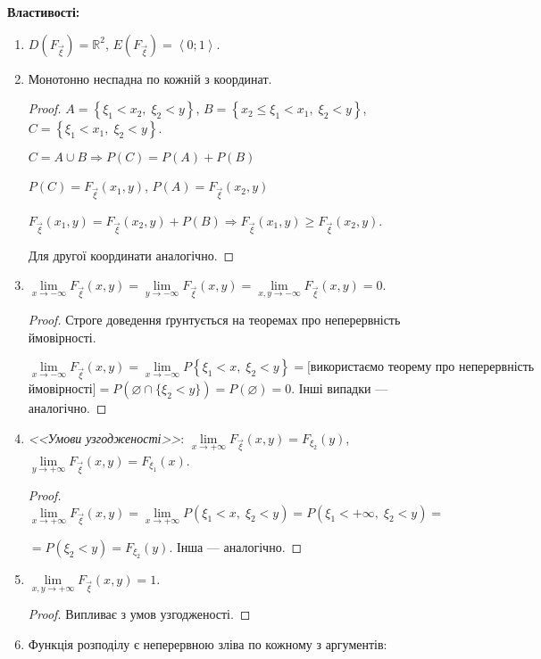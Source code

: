 \noindent\textbf{Властивості: }
\begin{enumerate}
    \item $D(F_{\vec{\xi}}) = \mathbb{R}^2$, $E(F_{\vec{\xi}}) = 
    \left<0; 1\right>$.
    \item Монотонно неспадна по кожній з координат.
    \begin{proof}
        $A = \left\{\xi_1 < x_2,\;\xi_2 < y \right\}$, 
        $B = \left\{x_2 \leq \xi_1 < x_1,\; \xi_2<y\right\}$, 
        $C = \left\{\xi_1 < x_1,\; \xi_2 < y\right\}$.

        $C = A \cup B \Rightarrow P(C) = P(A) + P(B)$
    
        $P(C) = F_{\vec{\xi}}(x_1, y)$,  
        $P(A) = F_{\vec{\xi}}(x_2, y)$

        $F_{\vec{\xi}}(x_1, y) = F_{\vec{\xi}}(x_2, y) + P(B)
        \Rightarrow F_{\vec{\xi}}(x_1, y) \geq  F_{\vec{\xi}}(x_2, y)$. 
        
        Для другої координати аналогічно.
    \end{proof}
    \item $\lim\limits_{x \to -\infty} F_{\vec{\xi}}(x, y) = 
           \lim\limits_{y \to -\infty} F_{\vec{\xi}}(x, y) = 
           \lim\limits_{x,y \to -\infty} F_{\vec{\xi}}(x, y) = 0$.
    \begin{proof}
        Строге доведення ґрунтується на теоремах про неперервність 
        ймовірності.

        $\lim\limits_{x \to -\infty} F_{\vec{\xi}}(x, y) = 
        \lim\limits_{x \to -\infty} P\left\{\xi_1<x,\;\xi_2<y\right\} 
        = [\text{використаємо теорему про неперервність}$ 
        $\text{ймовірності}] = P(\varnothing \cap \{\xi_2 < y\})
        = P(\varnothing) = 0$.
        Інші випадки --- аналогічно.
    \end{proof}
    \item \emph{<<Умови узгодженості>>}:
    $\lim\limits_{x \to +\infty} F_{\vec{\xi}}(x, y) = F_{\xi_2}(y)$, 
    $\lim\limits_{y \to +\infty} F_{\vec{\xi}}(x, y) = F_{\xi_1}(x)$.
    \begin{proof}
        $\lim\limits_{x \to +\infty} F_{\vec{\xi}}(x, y) = 
        \lim\limits_{x \to +\infty} 
        P\left(\xi_1 < x,\; \xi_2 < y\right) = 
        P\left(\xi_1 < +\infty,\;\xi_2<y\right) = $
        
        $= P\left(\xi_2<y\right) = F_{\xi_2}(y)$. Інша --- аналогічно.
    \end{proof}
    \item $\lim\limits_{x,y \to +\infty} F_{\vec{\xi}}(x, y) = 1$.
    \begin{proof}
        Випливає з умов узгодженості.
    \end{proof}
    \item Функція розподілу є неперервною зліва по кожному з аргументів: 
    

\end{enumerate}
